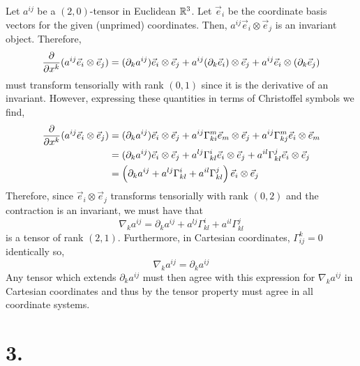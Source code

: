 \documentclass[12pt]{article}
\begin{document}
Let $a^{ij}$ be a $(2,0)$-tensor in Euclidean $\mathbb{R}^3$. Let $\vec{e}_i$ be the coordinate basis vectors for the given (unprimed) coordinates. Then, $a^{ij} \vec{e}_i \otimes \vec{e}_j$ is an invariant object. Therefore, 
\[ \frac{\partial{}}{\partial{x^k}} (a^{ij} \vec{e}_i \otimes \vec{e}_j) = (\partial_k a^{ij})\vec{e}_i \otimes \vec{e}_j + a^{ij} (\partial_k \vec{e}_i) \otimes \vec{e}_j + a^{ij} \vec{e}_i \otimes (\partial_k \vec{e}_j) \]
must transform tensorially with rank $(0, 1)$ since it is the derivative of an invariant. However, expressing these quantities in terms of Christoffel symbols we find,
\begin{align*}
\frac{\partial{}}{\partial{x^k}} (a^{ij} \vec{e}_i \otimes \vec{e}_j) & = (\partial_k a^{ij})\vec{e}_i \otimes \vec{e}_j + a^{ij} \Gamma^m_{ki} \vec{e}_m \otimes \vec{e}_j + a^{ij} \Gamma^m_{kj} \vec{e}_i \otimes \vec{e}_m
\\
& = (\partial_k a^{ij})\vec{e}_i \otimes \vec{e}_j + a^{lj} \Gamma^i_{kl} \vec{e}_i \otimes \vec{e}_j + a^{il} \Gamma^j_{kl} \vec{e}_i \otimes \vec{e}_j
\\
& = \left (\partial_k a^{ij}  + a^{lj} \Gamma^i_{kl}  + a^{il} \Gamma^j_{kl} \right) \vec{e}_i \otimes \vec{e}_j
\end{align*}
Therefore, since $\vec{e}_i \otimes \vec{e}_j$ transforms tensorially with rank $(0,2)$ and the contraction is an invariant, we must have that
\[ \nabla_k a^{ij} = \partial_k a^{ij}  + a^{lj} \Gamma^i_{kl}  + a^{il} \Gamma^j_{kl} \]
is a tensor of rank $(2, 1)$. Furthermore, in Cartesian coordinates, $\Gamma^{k}_{ij} = 0$ identically so,
\[ \nabla_k a^{ij} = \partial_k a^{ij} \]
Any tensor which extends $\partial_k a^{ij}$ must then agree with this expression for $\nabla_k a^{ij}$ in Cartesian coordinates and thus by the tensor property must agree in all coordinate systems.

\newcommand{\ihat}{\boldsymbol{\hat{\imath}}}
\newcommand{\jhat}{\boldsymbol{\hat{\jmath}}} 
\newcommand{\khat}{\boldsymbol{\hat{k}}}

\section*{3.}
\end{document}
